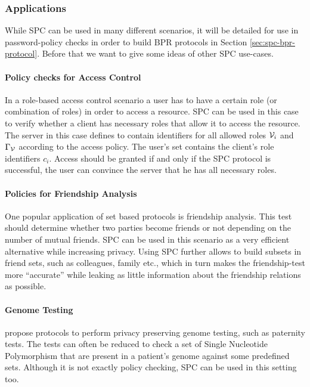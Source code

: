 \subsubsection{Applications}\label{sec:generalisation}
While \ac{SPC} can be used in many different scenarios, it will be detailed for use in password-policy checks in order to build \ac{BPR} protocols in Section \ref{sec:spc-bpr-protocol}.
Before that we want to give some ideas of other \ac{SPC} use-cases.

\paragraph{Policy checks for Access Control}
In a role-based access control scenario \cite{FerraioloK09} a user has to have a certain role (or combination of roles) in order to access a resource.
\ac{SPC} can be used in this case to verify whether a client has necessary roles that allow it to access the resource.
The server in this case defines \ServerSet to contain identifiers for all allowed roles $\mathcal{V}_i$ and $\Gamma_\mathcal{V}$ according to the access policy.
The user's set \ClientSet contains the client's role identifiers $c_i$.
Access should be granted if and only if the \ac{SPC} protocol is successful, \ie the user can convince the server that he has all necessary roles.

\paragraph{Policies for Friendship Analysis}
One popular application of set based protocols is friendship analysis.
This test should determine whether two parties become friends or not depending on the number of mutual friends.
\ac{SPC} can be used in this scenario as a very efficient alternative while increasing privacy.
Using \ac{SPC} further allows to build subsets in friend sets, such as colleagues, family etc., which in turn makes the friendship-test more ``accurate'' while leaking as little information about the friendship relations as possible.

\paragraph{Genome Testing}
\citet{BaldiBCGT11} propose protocols to perform privacy preserving genome testing, such as paternity tests. 
The tests can often be reduced to check a set of Single Nucleotide Polymorphism that are present in a patient's genome against some predefined sets. 
Although it is not exactly policy checking, \ac{SPC} can be used in this setting too. 


